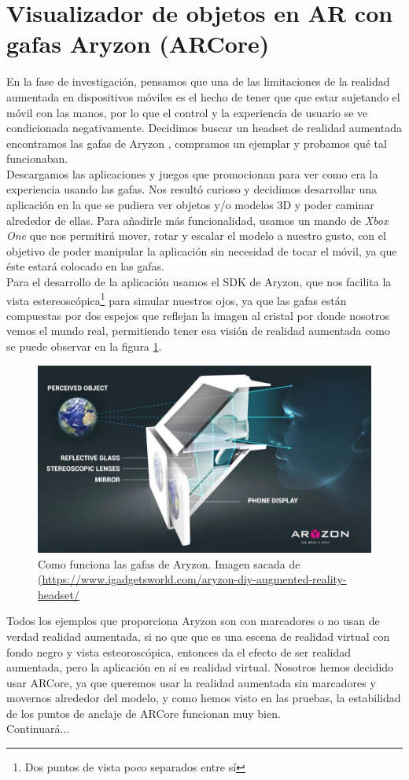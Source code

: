 \section{Visualizador de objetos en AR con gafas Aryzon (ARCore)}
En la fase de investigación, pensamos que una de las limitaciones de la realidad aumentada en dispositivos móviles es el hecho de tener que que estar sujetando el móvil con las manos, por lo que el control y la experiencia de usuario se ve condicionada negativamente. Decidimos buscar un headset de realidad aumentada encontramos las gafas de Aryzon \cite{Aryzon}, compramos un ejemplar y probamos qué tal funcionaban.\\
Descargamos las aplicaciones y juegos que promocionan para ver como era la experiencia usando las gafas. Nos resultó curioso y decidimos desarrollar una aplicación en la que se pudiera ver objetos y/o modelos 3D y poder caminar alrededor de ellas. Para añadirle más funcionalidad, usamos un mando de \textit{Xbox One} que nos permitirá mover, rotar y escalar el modelo a nuestro gusto, con el objetivo de poder manipular la aplicación sin necesidad de tocar el móvil, ya que éste estará colocado en las gafas.\\
Para el desarrollo de la aplicación usamos el SDK de Aryzon, que nos facilita la vista estereoscópica\footnote{ Dos puntos de vista poco separados entre sí} para simular nuestros ojos, ya que las gafas están compuestas por dos espejos que reflejan la imagen al cristal por donde nosotros vemos el mundo real, permitiendo tener esa visión de realidad aumentada como se puede observar en la figura \ref{GafasAryzon}.
\begin{figure}[H]
    \centering
    \includegraphics[width=0.5\linewidth]{Images/How-it-works.jpg}
    \caption{Como funciona las gafas de Aryzon. Imagen sacada de (\url{https://www.igadgetsworld.com/aryzon-diy-augmented-reality-headset/}}
    \label{GafasAryzon}
\end{figure}


Todos los ejemplos que proporciona Aryzon son con marcadores o no usan de verdad realidad aumentada, si no que que es una escena de realidad virtual con fondo negro y vista esteoroscópica, entonces da el efecto de ser realidad aumentada, pero la aplicación en sí es realidad virtual. Nosotros hemos decidido usar ARCore, ya que queremos usar la realidad aumentada sin marcadores y movernos alrededor del modelo, y como hemos visto en las pruebas, la estabilidad de los puntos de anclaje de ARCore funcionan muy bien.\\
Continuará...

\noindent